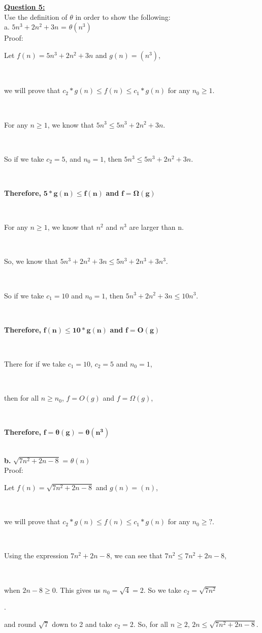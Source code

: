 \documentclass[12pt, letterpaper, twoside]{article}
\begin{document}
\noindent \textbf{\underline{Question 5:}}\\
Use the definition of $\theta$ in order to show the following:\\
a. $5n^3 + 2n^2 + 3n$ = $\theta(n^3)$\\
\break
Proof:\\
\centerline{Let $f(n) = 5n^3 + 2n^2 + 3n$ and $g(n) = (n^3)$, }\\
\centerline{we will prove that $c_{2} * g(n) \leq f(n) \leq c_{1} * g(n)$ for any $n_{0} \geq 1$. }\\
\break
\centerline{For any $n \geq 1$, we know that $5n^3 \leq 5n^3 + 2n^2 + 3n$.}\\
\centerline{So if we take $c_{2} = 5$, and $n_{0} = 1$, then $5n^3 \leq 5n^3 + 2n^2 + 3n$.}\\ 
\centerline{\textbf{Therefore, } $\mathbf{5 * g(n) \leq f(n)}$ \textbf{ and } $\mathbf{f = \Omega(g)}$}\\
\break
\centerline{For any $n \geq 1$, we know that $n^2$ and $n^3$ are larger than n.}\\
\centerline{So, we know that $5n^3 + 2n^2 + 3n \leq 5n^3 + 2n^3 + 3n^3$.}\\
\centerline{So if we take $c_{1} = 10$ and $n_{0} = 1$, then $5n^3 + 2n^2 + 3n \leq 10n^3$.}\\
\centerline{\textbf{Therefore,} $\mathbf{f(n) \leq 10 * g(n)}$ \textbf{and} $\mathbf{f = O(g)}$}\\
\break
\centerline{There for if we take $c_{1} = 10$, $c_{2} = 5$ and $n_{0} = 1$, }\\
\centerline{then for all $n \geq n_{0}$, $f = O(g)$ and $f = \Omega (g)$,}\\
\centerline{\textbf{Therefore,} $\mathbf{f = \theta(g) = \theta(n^3)}$}\\
\newpage
\noindent\textbf{b.} $\sqrt{7n^2 + 2n - 8}$ = $\theta(n)$\\
\break
\break
Proof:\\
\centerline{Let $f(n) = \sqrt{7n^2 + 2n - 8}$ and $g(n) = (n)$, }\\
\centerline{we will prove that $c_{2} * g(n) \leq f(n) \leq c_{1} * g(n)$ for any $n_{0} \geq ?$. }\\
\break
\centerline{Using the expression $7n^2 + 2n - 8$, we can see that $7n^2 \leq 7n^2 + 2n - 8$,}\\
\centerline{when $2n - 8 \geq 0$. This gives us $n_{0} = \sqrt{4} = 2$. So we take $c_{2} = \sqrt{7n^2}$}.\\
\centerline{and round $\sqrt{7}$ down to 2 and take $c_{2} = 2$. So, for all $n \geq 2$, $2n \leq  \sqrt{7n^2 + 2n - 8}$.}
\end{document}
